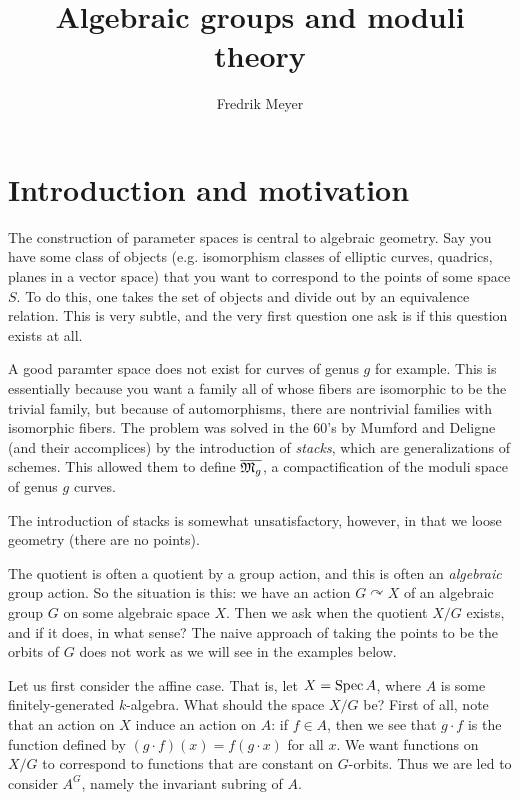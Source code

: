 \documentclass[11pt, english]{article}
\begin{document}
\title{Algebraic groups and moduli theory}
\author{Fredrik Meyer}
\maketitle


\section{Introduction and motivation}

The construction of parameter spaces is central to algebraic geometry. Say you have some class of objects (e.g. isomorphism classes of elliptic curves, quadrics, planes in a vector space) that you want to correspond to the points of some space $S$. To do this, one takes the set of objects and divide out by an equivalence relation. This is very subtle, and the very first question one ask is if this question exists at all.

A good paramter space does not exist for curves of genus $g$ for example. This is essentially because you want a family all of whose fibers are isomorphic to be the trivial family, but because of automorphisms, there are nontrivial families with isomorphic fibers. The problem was solved in the 60's by Mumford and Deligne (and their accomplices) by the introduction of \emph{stacks}, which are generalizations of schemes. This allowed them to define $\overline{\mathfrak M_g}$, a compactification of the moduli space of genus $g$ curves.

The introduction of stacks is somewhat unsatisfactory, however, in that we loose geometry (there are no points).

The quotient is often a quotient by a group action, and this is often an \emph{algebraic} group action. So the situation is this: we have an action $G \curvearrowright X$ of an algebraic group $G$ on some algebraic space $X$. Then we ask when the quotient $X/G$ exists, and if it does, in what sense? The naive approach of taking the points to be the orbits of $G$ does not work as we will see in the examples below.

Let us first consider the affine case. That is, let $X = \operatorname{Spec} A$, where $A$ is some finitely-generated $k$-algebra. What should the space $X/G$ be? First of all, note that an action on $X$ induce an action on $A$: if $f \in A$, then we see that $g \cdot f$ is the function defined by $(g \cdot f)(x)=f(g \cdot x)$ for all $x$. We want functions on $X/G$ to correspond to functions that are constant on $G$-orbits. Thus we are led to consider $A^G$, namely the invariant subring of $A$.
\end{document}
